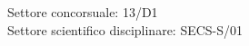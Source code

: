 \documentclass[
12pt, %
english, %
onehalfspacing,%
headsepline, %
]{MastersDoctoralThesis} %
\author{Giada \textsc{Spaccapanico Proietti}} %
\numberwithin{equation}{chapter} %
\begin{document}
	
	
	\frontmatter %
	
	\pagestyle{plain} %
	
	
	\begin{titlepage}
		
		\begin{center}
			{\scshape \large \univname\par}
			{\scshape \large \deptname\par}\vspace{0.5cm} %
			{\scshape  \degreename\par}\vspace{1cm} %
			
			{ Settore concorsuale: 13/D1}\\
			{ Settore scientifico disciplinare: SECS-S/01}\vspace{1cm}
			
			\HRule \\[0.4cm] %
			{\LARGE \bfseries \ttitle\par}\vspace{0.2cm} %
			\HRule \\[1.5cm] %
			

\end{center}
\end{titlepage}
\end{document}
